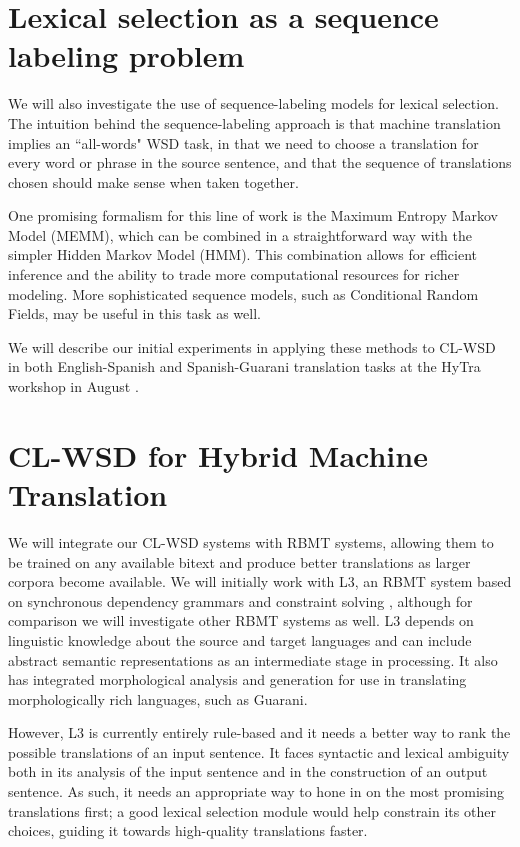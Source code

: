 \documentclass{article}
\begin{document}
\section{Lexical selection as a sequence labeling problem}
We will also investigate the use of sequence-labeling models for
lexical selection.  The intuition behind the sequence-labeling approach is that
machine translation implies an ``all-words" WSD task, in that we need to choose
a translation for every word or phrase in the source sentence, and that the
sequence of translations chosen should make sense when taken together.

One promising formalism for this line of work is the Maximum
Entropy Markov Model (MEMM), which can be combined in a straightforward way
with the simpler Hidden Markov Model (HMM). This combination allows for
efficient inference and the ability to trade more computational resources for
richer modeling. More sophisticated sequence models, such as Conditional Random
Fields, may be useful in this task as well.

We will describe our initial experiments in applying these methods to CL-WSD in
both English-Spanish and Spanish-Guarani translation tasks at the HyTra
workshop in August \cite{rudnick-gasser:2013:HyTra-2013}.

\section{CL-WSD for Hybrid Machine Translation}
We will integrate our CL-WSD systems with RBMT systems, allowing them
to be trained on any available bitext and produce better translations as larger
corpora become available.
We will initially work with L3, an RBMT system based on synchronous dependency
grammars and constraint solving \cite{gasser:sxdg,gasser:aflat2012},
although for comparison we will investigate other RBMT systems as well. L3
depends on linguistic knowledge about the source and target languages and can
include abstract semantic representations as an intermediate stage in
processing. It also has integrated morphological analysis and generation for
use in translating morphologically rich languages, such as Guarani.

However, L3 is currently entirely rule-based and it needs a better way to rank
the possible translations of an input sentence. It faces syntactic and lexical
ambiguity both in its analysis of the input sentence and in the construction of
an output sentence. As such, it needs an appropriate way to hone in on the most
promising translations first; a good lexical selection module would help
constrain its other choices, guiding it towards high-quality translations
faster.
\end{document}
